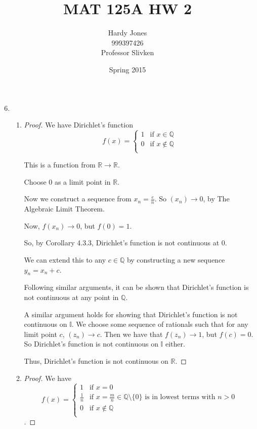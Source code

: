 \documentclass[12pt,letterpaper]{article}
\title{MAT 125A HW 2\vspace{-2ex}}
\author{Hardy Jones\\
        999397426\\
        Professor Slivken\vspace{-2ex}}
\date{Spring 2015}
\newcommand\e{e}
\begin{document}
  \maketitle

  \begin{enumerate}[label=Exercise 4.3.\arabic*]
    \setcounter{enumi}{5}
    \item
      \begin{enumerate}
        \item
          \begin{proof}
            We have Dirichlet's function
            \[
              f(x) =
              \begin{cases}
                1 & \text{if } x \in \mathbb{Q} \\
                0 & \text{if } x \notin \mathbb{Q} \\
              \end{cases}
            \]

            This is a function from $\mathbb{R} \to \mathbb{R}$.

            Choose 0 as a limit point in $\mathbb{R}$.

            Now we construct a sequence from $x_n = \frac{\e}{n}$.
            So $(x_n) \to 0$, by The Algebraic Limit Theorem.

            Now, $f(x_n) \to 0$, but $f(0) = 1$.

            So, by Corollary 4.3.3, Dirichlet's function is not continuous at 0.

            We can extend this to any $c \in \mathbb{Q}$
            by constructing a new sequence $y_n = x_n + c$.

            Following similar arguments,
            it can be shown that Dirichlet's function is not continuous at any point in $\mathbb{Q}$.

            A similar argument holds for showing that Dirichlet's function is not continuous on $\mathbb{I}$.
            We choose some sequence of rationals such that for any limit point $c$,
            $(z_n) \to c$.
            Then we have that $f(z_n) \to 1$, but $f(c) = 0$.
            So Dirichlet's function is not continuous on $\mathbb{I}$ either.

            Thus, Dirichlet's function is not continuous on $\mathbb{R}$.
          \end{proof}
        \item
          \begin{proof}
            We have
            \[
              f(x) =
              \begin{cases}
                1           & \text{if } x = 0 \\
                \frac{1}{n} & \text{if } x = \frac{m}{n} \in \mathbb{Q} \setminus \{0\} \text{ is in lowest terms with } n > 0 \\
                0           & \text{if } x \notin \mathbb{Q} \\
              \end{cases}
            \].


\end{proof}
\end{enumerate}
\end{enumerate}
\end{document}
